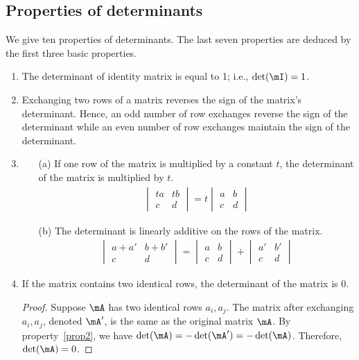 \documentclass[11pt]{article}
\theoremstyle{plain}
\theoremstyle{definition}
\begin{document}
\subsection{Properties of determinants}
We give ten properties of determinants. The last seven properties are deduced by the first three basic properties.
\begin{enumerate}
	\item\label{prop1} The determinant of identity matrix is equal to 1; i.e., $\det(\mI) = 1$.
	\item\label{prop2} Exchanging two rows of a matrix reverses the sign of the matrix's determinant. Hence, an odd number of row exchanges reverse the sign of the determinant while an even number of row exchanges maintain the sign of the determinant.
	\item\label{prop3} \begin{enumerate} 
	\item[(a)] If one row of the matrix is multiplied by a constant $t$, the determinant of the matrix is multiplied by $t$.
	\begin{align}
		\begin{vmatrix}
			ta&tb\\c &d 
		\end{vmatrix} = t \begin{vmatrix}
			a&b\\c &d
			\end{vmatrix}
	\end{align} 
	\item[(b)] The determinant is linearly additive on the rows of the matrix.
	\begin{align}
		\begin{vmatrix}
			a+a'&b+b'\\c &d 
		\end{vmatrix} =  \begin{vmatrix}
			a&b\\c &d
			\end{vmatrix} +  \begin{vmatrix}
			a'&b'\\c &d
			\end{vmatrix} 
	\end{align}
	\end{enumerate}

	\item \label{propidenticalrow} If the matrix contains two identical rows, the determinant of the matrix is 0.  
	\begin{proof}
		Suppose $\mA$ has two identical rows $a_i, a_j$. The matrix after exchanging $a_i, a_j$, denoted $\mA'$, is the same as the original matrix $\mA$. By property~\ref{prop2}, we have $\det(\mA) = -\det(\mA') = -\det(\mA)$. Therefore, $\det(\mA) = 0$.
	\end{proof}


\end{enumerate}
\end{document}
